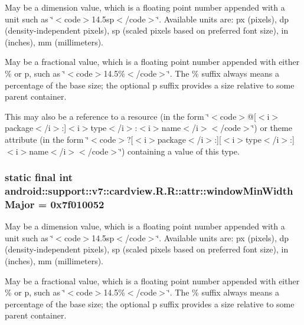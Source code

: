 May be a dimension value, which is a floating point number appended with a unit such as \char`\"{}$<$code$>$14.5sp$<$/code$>$\char`\"{}. Available units are: px (pixels), dp (density-independent pixels), sp (scaled pixels based on preferred font size), in (inches), mm (millimeters). 

May be a fractional value, which is a floating point number appended with either \% or p, such as \char`\"{}$<$code$>$14.5\%$<$/code$>$\char`\"{}. The \% suffix always means a percentage of the base size; the optional p suffix provides a size relative to some parent container. 

This may also be a reference to a resource (in the form \char`\"{}$<$code$>$@\mbox{[}$<$i$>$package$<$/i$>$:\mbox{]}$<$i$>$type$<$/i$>$:$<$i$>$name$<$/i$>$$<$/code$>$\char`\"{}) or theme attribute (in the form \char`\"{}$<$code$>$?\mbox{[}$<$i$>$package$<$/i$>$:\mbox{]}\mbox{[}$<$i$>$type$<$/i$>$:\mbox{]}$<$i$>$name$<$/i$>$$<$/code$>$\char`\"{}) containing a value of this type. \hypertarget{classandroid_1_1support_1_1v7_1_1cardview_1_1_r_1_1attr_1553937225fb4cdcd668f8f6e3109563}{
\subsubsection[{windowMinWidthMajor}]{\setlength{\rightskip}{0pt plus 5cm}static final int android::support::v7::cardview.R.R::attr::windowMinWidthMajor = 0x7f010052}}
\label{classandroid_1_1support_1_1v7_1_1cardview_1_1_r_1_1attr_1553937225fb4cdcd668f8f6e3109563}


May be a dimension value, which is a floating point number appended with a unit such as \char`\"{}$<$code$>$14.5sp$<$/code$>$\char`\"{}. Available units are: px (pixels), dp (density-independent pixels), sp (scaled pixels based on preferred font size), in (inches), mm (millimeters). 

May be a fractional value, which is a floating point number appended with either \% or p, such as \char`\"{}$<$code$>$14.5\%$<$/code$>$\char`\"{}. The \% suffix always means a percentage of the base size; the optional p suffix provides a size relative to some parent container. 

